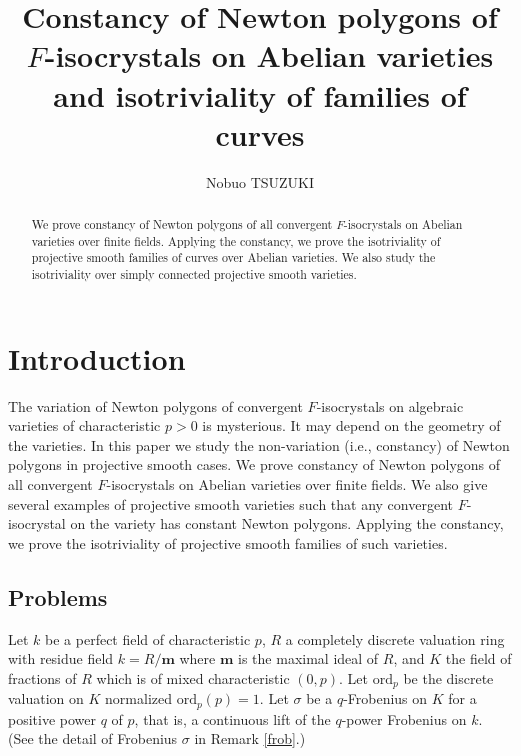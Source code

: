 \documentclass[11pt]{amsart}
\title[Constancy of Newton polygons and isotriviality of families of curves]
{\bf Constancy of Newton polygons of $F$-isocrystals on Abelian varieties and isotriviality of families of curves}
\author[N.~TSUZUKI]{Nobuo TSUZUKI}
\begin{document}
\begin{abstract}
We prove constancy of Newton polygons of all convergent $F$-isocrystals on Abelian varieties over finite fields. 
Applying the constancy, we prove the isotriviality of projective smooth families of curves over Abelian varieties. 
We also study the isotriviality over simply connected projective smooth varieties. 
\end{abstract}

\maketitle

\section{Introduction}

The variation of Newton polygons of convergent $F$-isocrystals on algebraic varieties of characteristic $p > 0$ is mysterious. 
It may depend on the geometry of the varieties. In this paper we study the non-variation (i.e., constancy) of Newton polygons 
in projective smooth cases. 
We prove constancy of Newton polygons of all convergent $F$-isocrystals on Abelian varieties over finite fields. 
We also give several examples of projective smooth varieties such that any convergent $F$-isocrystal on the variety 
has constant Newton polygons. Applying the constancy, we prove the isotriviality of projective smooth families of such varieties. 

\subsection{Problems}
Let $k$ be a perfect field of characteristic $p$, $R$ a completely discrete valuation ring 
with residue field $k = R/\mathbf m$ where $\mathbf m$ is the maximal 
ideal of $R$, and $K$ the field of fractions of $R$ which is 
of mixed characteristic $(0, p)$. Let $\mathrm{ord}_p$ be the discrete valuation on $K$ normalized $\mathrm{ord}_p(p) = 1$. 
Let $\sigma$ be a $q$-Frobenius on $K$ for a positive power $q$ of $p$, that is, 
a continuous lift of the $q$-power Frobenius on $k$. (See the detail of Frobenius $\sigma$ in Remark \ref{frob}.) 
\end{document}
